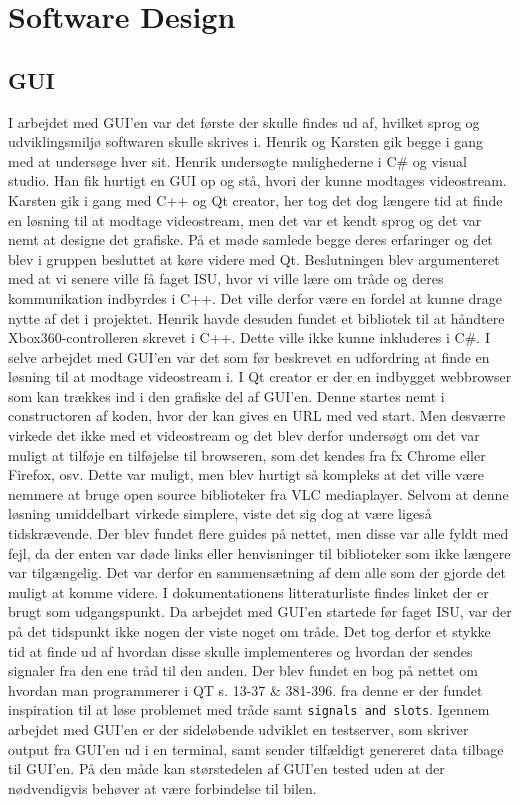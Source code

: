 \section{Software Design} \label{ch:SWdesign}


\subsection{GUI}
I arbejdet med GUI’en var det første der skulle findes ud af, hvilket sprog og udviklingsmiljø softwaren skulle skrives i. Henrik og Karsten gik begge i gang med at undersøge hver sit. Henrik undersøgte mulighederne i C\# og visual studio. Han fik hurtigt en GUI op og stå, hvori der kunne modtages videostream. Karsten gik i gang med C++ og Qt creator, her tog det dog længere tid at finde en løsning til at modtage videostream, men det var et kendt sprog og det var nemt at designe det grafiske. På et møde samlede begge deres erfaringer og det blev i gruppen besluttet at køre videre med Qt. Beslutningen blev argumenteret med at vi senere ville få faget ISU, hvor vi ville lære om tråde og deres kommunikation indbyrdes i C++. Det ville derfor være en fordel at kunne drage nytte af det i projektet. Henrik havde desuden fundet et bibliotek til at håndtere Xbox360-controlleren skrevet i C++. Dette ville ikke kunne inkluderes i C\#.
I selve arbejdet med GUI’en var det som før beskrevet en udfordring at finde en løsning til at modtage videostream i. I Qt creator er der en indbygget webbrowser som kan trækkes ind i den grafiske del af GUI’en. Denne startes nemt i constructoren af koden, hvor der kan gives en URL med ved start. Men desværre virkede det ikke med et videostream og det blev derfor undersøgt om det var muligt at tilføje en tilføjelse til browseren, som det kendes fra fx Chrome eller Firefox, osv. Dette var muligt, men blev hurtigt så kompleks at det ville være nemmere at bruge open source biblioteker fra VLC mediaplayer. Selvom at denne løsning umiddelbart virkede simplere, viste det sig dog at være ligeså tidskrævende. Der blev fundet flere guides på nettet, men disse var alle fyldt med fejl, da der enten var døde links eller henvisninger til biblioteker som ikke længere var tilgængelig. Det var derfor en sammensætning af dem alle som der gjorde det muligt at komme videre. I dokumentationens litteraturliste findes linket \cite{lib:vlc-using-qt} der er brugt som udgangspunkt. 
Da arbejdet med GUI’en startede før faget ISU, var der på det tidspunkt ikke nogen der viste noget om tråde. Det tog derfor et stykke tid at finde ud af hvordan disse skulle implementeres og hvordan der sendes signaler fra den ene tråd til den anden. Der blev fundet en bog på nettet om hvordan man programmerer i QT \cite{lib:qt-bog} s. 13-37 \& 381-396. fra denne er der fundet inspiration til at løse problemet med tråde samt \texttt{signals and slots}. Igennem arbejdet med GUI'en er der sideløbende udviklet en testserver, som skriver output fra GUI'en ud i en terminal, samt sender tilfældigt genereret data tilbage til GUI'en. På den måde kan størstedelen af GUI'en tested uden at der nødvendigvis behøver at være forbindelse til bilen. 
